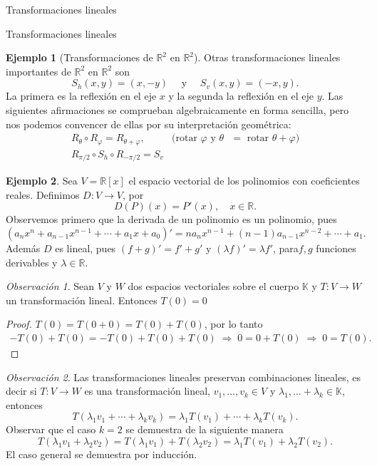 \documentclass[a4paper,12pt,twoside,spanish]{amsbook}
\theoremstyle{definition}
\newtheorem{ejemplo}{Ejemplo}[section]
\theoremstyle{remark}
\newtheorem{obs}{Observaci\'on}[section]
\newcommand{\R}{\mathbb R}
\newcommand{\K}{\mathbb K}
\begin{document}
\begin{chapter}{Transformaciones lineales}
\begin{section}{Transformaciones lineales}
\begin{ejemplo}[Transformaciones de $\R^2$ en $\R^2$]
				
				
				Otras transformaciones lineales importantes de $\R^2$ en $\R^2$ son 
				$$
				S_h(x,y) = (x,-y) \quad \text{ y } \quad S_v(x,y) = (-x,y).
				$$
				La primera es la reflexión en el eje $x$ y la segunda la reflexión en el eje $y$. Las siguientes afirmaciones se comprueban algebraicamente en forma sencilla, pero nos podemos convencer de ellas por su interpretación geométrica:
				\begin{equation*}
				\begin{array}{ll}
				R_\theta \circ R_\varphi = R_{\theta +\varphi}, \quad &\text{(rotar $\varphi$ y $\theta$ $=$  rotar $\theta+\varphi$)} \\
				R_{\pi/2} \circ S_h \circ R_{-\pi/2} = S_v&
				\end{array}
				\end{equation*}
				
			\end{ejemplo}
	
		
			\begin{ejemplo}
			Sea $V = \R[x]$ el espacio vectorial de los polinomios con coeficientes reales. Definimos $D:V \to V$, por
			$$
			D(P)(x) = P'(x),\quad x \in \R. 
			$$
			Observemos primero que la derivada de un polinomio es un polinomio, pues 
			$$
			(a_nx^n+ a_{n-1}x^{n-1}+\cdots + a_1 x + a_0)' = na_nx^{n-1}+ (n-1)a_{n-1}x^{n-2}+\cdots + a_1.
			$$
			Además  $D$  es lineal, pues $(f+g)' = f' + g'$ y $(\lambda f)' = \lambda f'$, para$f,g$ funciones derivables y $\lambda \in \R$.
			\end{ejemplo} 
		
		\begin{obs}	Sean $V$ y $W$ dos espacios vectoriales sobre el cuerpo $\K$ y 	 $T:V \to W$			un transformación lineal. Entonces $T(0) =0$
		\end{obs}
		\begin{proof} $T(0) = T(0+0) = T(0) + T(0)$, por lo tanto 
			\begin{align*}
				-T(0) + T(0) = -T(0) + T(0)+T(0) \;\Rightarrow\; 0 = 0 +T(0) \;\Rightarrow\; 0= T(0).
			\end{align*}
		\end{proof}
		
		\begin{obs}
			Las transformaciones lineales preservan  combinaciones lineales, es decir si $T:V \to W$ es una transformación lineal, $ v_1,\ldots,v_k \in V$ y $\lambda_1, \ldots+ \lambda_k \in \K$,  entonces
			$$
			T(\lambda_1 v_1 + \cdots+ \lambda_k v_k) = \lambda_1 T(v_1) + \cdots+ \lambda_k T(v_k).
			$$
			Observar que el caso $k=2$ se demuestra de la siguiente manera
			$$
			T(\lambda_1 v_1 +  \lambda_2 v_2) =T(\lambda_1 v_1) + T(\lambda_2 v_2) =\lambda_1 T(v_1) + \lambda_2T( v_2).
			$$
			El caso general se demuestra por inducción. 
		

\end{obs}
\end{section}
\end{chapter}
\end{document}
